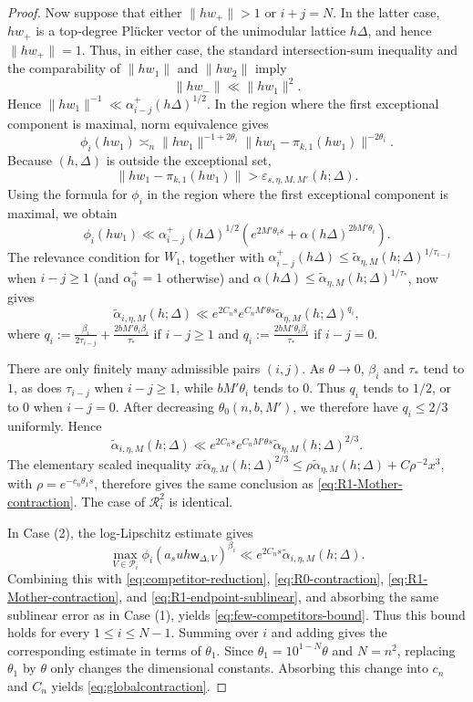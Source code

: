 \documentclass[reqno,11pt]{amsart}
\numberwithin{equation}{section}
\theoremstyle{definition}
\theoremstyle{remark}
\begin{document}
\begin{proof}
 Now suppose that either $\|hw_+\|>1$ or $i+j=N$. In the latter
case, $hw_+$ is a top-degree Pl\"ucker vector of the unimodular lattice
$h\Delta$, and hence $\|hw_+\|=1$. Thus, in either case, the standard intersection-sum inequality and the comparability of $\|hw_1\|$ and
$\|hw_2\|$ imply
$$
\|hw_-\|\ll\|hw_1\|^2.
$$
Hence $\|hw_1\|^{-1}\ll
\alpha_{i-j}^+(h\Delta)^{1/2}$. In the region where the first
exceptional component is maximal, norm equivalence gives
$$
\phi_i(hw_1)\asymp_n
\|hw_1\|^{-1+2\theta_i}
\|hw_1-\pi_{k,1}(hw_1)\|^{-2\theta_i}.
$$
Because $(h,\Delta)$ is outside the exceptional set,
$$
\|hw_1-\pi_{k,1}(hw_1)\|
>\varepsilon_{s,\eta,M,M'}(h;\Delta).
$$
Using the formula for $\phi_i$ in the region where the first exceptional
component is maximal, we obtain
$$
\phi_i(hw_1)
\ll
\alpha_{i-j}^+(h\Delta)^{1/2}
\left(
 e^{2M'\theta_is}
 +\alpha(h\Delta)^{2bM'\theta_i}
\right).
$$
The relevance condition for $W_1$, together with
$\alpha_{i-j}^+(h\Delta)
\le \widetilde\alpha_{\eta,M}(h;\Delta)^{1/\tau_{i-j}}$ when $i-j\ge1$
(and $\alpha_0^+=1$ otherwise) and
$\alpha(h\Delta)\le \widetilde\alpha_{\eta,M}(h;\Delta)^{1/\tau_*}$, now gives
$$
\widetilde\alpha_{i,\eta,M}(h;\Delta)
\ll
e^{2C_ns}e^{C_nM'\theta s}
\widetilde\alpha_{\eta,M}(h;\Delta)^{q_i},
$$
where $q_i:=
\frac{\beta_i}{2\tau_{i-j}}
+
\frac{2bM'\theta_i\beta_i}{\tau_*}$ if $i-j\ge 1$ and
$q_i:=
\frac{2bM'\theta_i\beta_i}{\tau_*}$ if $i-j=0$.

There are only finitely many admissible pairs $(i,j)$. As $\theta\to0$,
$\beta_i$ and $\tau_*$ tend to $1$, as does $\tau_{i-j}$ when $i-j\ge 1$,
while $bM'\theta_i$ tends to $0$.
Thus $q_i$ tends to $1/2$, or to $0$ when $i-j=0$.
After decreasing $\theta_0(n,b,M')$, we therefore have $q_i\le2/3$
uniformly. Hence
\begin{equation}\label{eq:R1-endpoint-sublinear}
\widetilde\alpha_{i,\eta,M}(h;\Delta)
\ll e^{2C_ns}e^{C_nM'\theta s}
\widetilde\alpha_{\eta,M}(h;\Delta)^{2/3}.
\end{equation}
The elementary scaled inequality
$x\widetilde\alpha_{\eta,M}(h;\Delta)^{2/3}
\le \rho\widetilde\alpha_{\eta,M}(h;\Delta)+C\rho^{-2}x^3$, with
$\rho=e^{-c_n\theta_1 s}$, therefore gives the same conclusion as
\eqref{eq:R1-Mother-contraction}. The case of $\mathcal R_i^2$ is
identical.

In Case (2), the log-Lipschitz estimate gives
$$
\max_{V\in\mathcal P_i}
\phi_i(a_suh\mathsf w_{\Delta,V})^{\beta_i}
\ll e^{2C_ns}\widetilde\alpha_{i,\eta,M}(h;\Delta).
$$
Combining this with \eqref{eq:competitor-reduction},
\eqref{eq:R0-contraction}, \eqref{eq:R1-Mother-contraction}, and
\eqref{eq:R1-endpoint-sublinear}, and absorbing the same sublinear error as
in Case (1), yields \eqref{eq:few-competitors-bound}. Thus this
bound holds for every $1\le i\le N-1$. Summing over $i$ and adding
 gives the corresponding estimate in
terms of $\theta_1$. Since $\theta_1=10^{1-N}\theta$ and $N=n^2$, replacing
$\theta_1$ by $\theta$ only changes the dimensional constants. Absorbing
this change into $c_n$ and $C_n$ yields \eqref{eq:globalcontraction}.
\end{proof}
\end{document}
